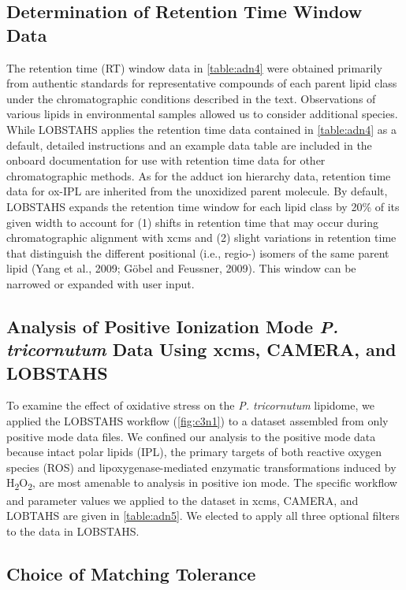 \subsection{Determination of Retention Time Window Data}

The retention time (RT) window data in \autoref{table:adn4} were obtained primarily from authentic standards for representative compounds of each parent lipid class under the chromatographic conditions described in the text. Observations of various lipids in environmental samples allowed us to consider additional species. While LOBSTAHS applies the retention time data contained in \autoref{table:adn4} as a default, detailed instructions and an example data table are included in the onboard documentation for use with retention time data for other chromatographic methods. As for the adduct ion hierarchy data, retention time data for ox-IPL are inherited from the unoxidized parent molecule. By default, LOBSTAHS expands the retention time window for each lipid class by 20\% of its given width to account for (1) shifts in retention time that may occur during chromatographic alignment with xcms and (2) slight variations in retention time that distinguish the different positional (i.e., regio-) isomers of the same parent lipid (Yang et al., 2009; G\"{o}bel and Feussner, 2009). This window can be narrowed or expanded with user input.

\subsection{Analysis of Positive Ionization Mode \emph{P. tricornutum} Data Using xcms, CAMERA, and LOBSTAHS}

To examine the effect of oxidative stress on the \emph{P. tricornutum} lipidome, we applied the LOBSTAHS workflow (\autoref{fig:c3n1}) to a dataset assembled from only positive mode data files. We confined our analysis to the positive mode data because intact polar lipids (IPL), the primary targets of both reactive oxygen species (ROS) and lipoxygenase-mediated enzymatic transformations induced by H\textsubscript{2}O\textsubscript{2}, are most amenable to analysis in positive ion mode. The specific workflow and parameter values we applied to the dataset in xcms, CAMERA, and LOBTAHS are given in \autoref{table:adn5}. We elected to apply all three optional filters to the data in LOBSTAHS.

\subsection{Choice of Matching Tolerance}

